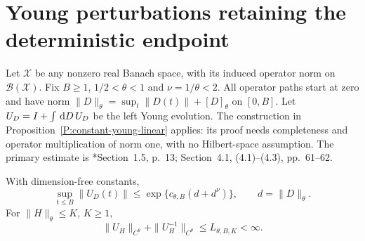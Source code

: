 \section{Young perturbations retaining the deterministic endpoint}
\label{S:young-upper-foundation}

Let $\mathcal{X}$ be any nonzero real Banach space, with its induced operator
norm on $\mathcal{B}(\mathcal{X})$. Fix $B \ge 1$, $1/2 < \theta < 1$ and $\nu =
1/\theta < 2$. All operator paths start at zero and have norm $\|D\|_\theta =
\sup_t\|D(t)\|+[D]_\theta$ on $[0,B]$. Let $U_D = I+\int\,\mathrm{d} D\,U_D$ be the left
Young evolution. The construction in Proposition~\ref{P:constant-young-linear}
applies: its proof needs completeness and operator multiplication of norm one,
with no Hilbert-space assumption. The primary estimate is
\cite{friz.hairer:20:course}*{Section~1.5, p.~13; Section~4.1, (4.1)--(4.3),
pp.~61--62}.

\begin{lemma}
  \label{L:young-upper-growth}
  With dimension-free constants,
  \begin{equation}\label{E:young-upper-refined-growth}
    \sup_{t\le B}\|U_D(t)\|
    \le\exp\{c_{\theta,B}(d+d^\nu)\},\qquad d=\|D\|_\theta .
  \end{equation}
  For $\|H\|_\theta \le K$, $K \ge 1$,
  \begin{equation}\label{E:young-upper-inverse-control}
    \|U_H\|_{C^\theta}+\|U_H^{-1}\|_{C^\theta}
    \le L_{\theta,B,K}<\infty .
  \end{equation}
\end{lemma}

